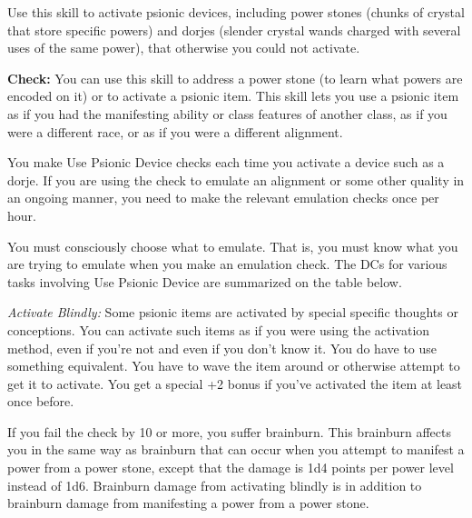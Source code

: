 Use this skill to activate psionic devices, including power stones (chunks of crystal that store specific powers) and dorjes (slender crystal wands charged with several uses of the same power), that otherwise you could not activate.

\textbf{Check:} You can use this skill to address a power stone (to learn what powers are encoded on it) or to activate a psionic item. This skill lets you use a psionic item as if you had the manifesting ability or class features of another class, as if you were a different race, or as if you were a different alignment.

You make Use Psionic Device checks each time you activate a device such as a dorje. If you are using the check to emulate an alignment or some other quality in an ongoing manner, you need to make the relevant emulation checks once per hour.

You must consciously choose what to emulate. That is, you must know what you are trying to emulate when you make an emulation check. The DCs for various tasks involving Use Psionic Device are summarized on the table below.


\textit{Activate Blindly:} Some psionic items are activated by special specific thoughts or conceptions. You can activate such items as if you were using the activation method, even if you're not and even if you don't know it. You do have to use something equivalent. You have to wave the item around or otherwise attempt to get it to activate. You get a special +2 bonus if you've activated the item at least once before.

If you fail the check by 10 or more, you suffer brainburn. This brainburn affects you in the same way as brainburn that can occur when you attempt to manifest a power from a power stone, except that the damage is 1d4 points per power level instead of 1d6. Brainburn damage from activating blindly is in addition to brainburn damage from manifesting a power from a power stone.

